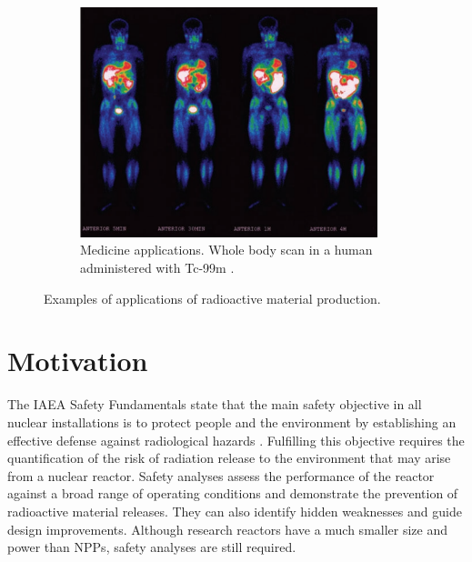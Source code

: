 \begin{figure}[htbp!]
  \hfill
  \begin{subfigure}[b]{0.49\textwidth}
    \centering
    \includegraphics[width=0.95\textwidth]{figures/tc-99}
    \caption{Medicine applications. Whole body scan in a human administered with Tc-99m \cite{tc99m}.}
  \end{subfigure}
  \caption{Examples of applications of radioactive material production.}
  \label{fig:intro-2}
\end{figure}



\section{Motivation}


The \gls*{IAEA} Safety Fundamentals state that the main safety objective in all nuclear installations is to protect people and the environment by establishing an effective defense against radiological hazards \cite{iaea-safety2}.
Fulfilling this objective requires the quantification of the risk of radiation release to the environment that may arise from a nuclear reactor.
Safety analyses assess the performance of the reactor against a broad range of operating conditions and demonstrate the prevention of radioactive material releases.
They can also identify hidden weaknesses and guide design improvements.
Although research reactors have a much smaller size and power than \glspl*{NPP}, safety analyses are still required.

